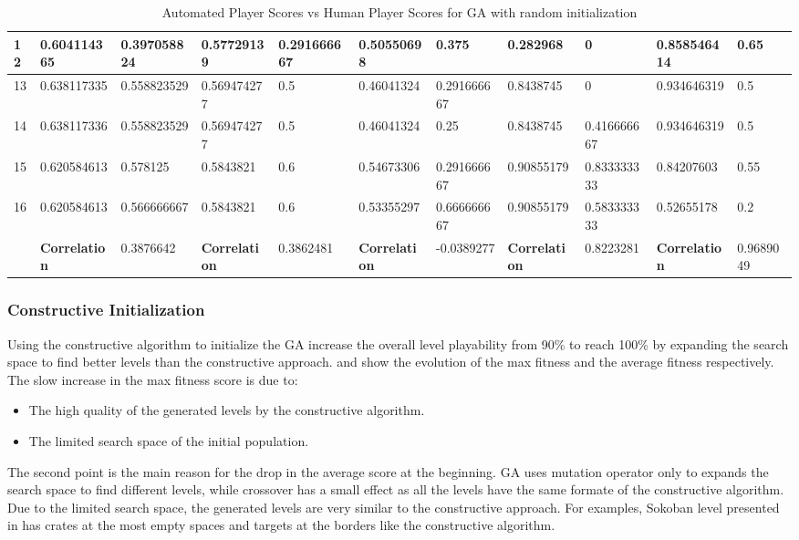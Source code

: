 \begin{landscape}
\begin{table}[!ht]
\begin{tabular}{|p{0.5in}|p{0.75in}|p{0.75in}|p{0.75in}|p{0.75in}|p{0.75in}|p{0.75in}|p{0.75in}|p{0.75in}|p{0.75in}|p{0.75in}|}
		\hline
		12 & 0.604114365 & 0.397058824 & 0.57729139 & 0.291666667 & 0.50550698 & 0.375 & 0.282968 & 0 & 0.858546414 & 0.65\\
		\hline
		13 & 0.638117335 & 0.558823529 & 0.569474277 & 0.5 & 0.46041324 & 0.291666667 & 0.8438745 & 0 & 0.934646319 & 0.5\\
		\hline
		14 & 0.638117336 & 0.558823529 & 0.569474277 & 0.5 & 0.46041324 & 0.25 & 0.8438745 & 0.416666667 & 0.934646319 & 0.5\\
		\hline
		15 & 0.620584613 & 0.578125 & 0.5843821 & 0.6 & 0.54673306 & 0.291666667 & 0.90855179 & 0.833333333 & 0.84207603 & 0.55\\
		\hline
		16 & 0.620584613 & 0.566666667 & 0.5843821 & 0.6 & 0.53355297 & 0.666666667 & 0.90855179 & 0.583333333 & 0.52655178 & 0.2\\
		\hline
		 & \textbf{Correlation} & 0.3876642 & \textbf{Correlation} & 0.3862481 & \textbf{Correlation} & -0.0389277 & \textbf{Correlation} & 0.8223281 & \textbf{Correlation} & 0.9689049\\
		\hline
	\end{tabular}
	\caption{Automated Player Scores vs Human Player Scores for GA with random initialization}
	\label{Table:randomScores}
\end{table}
\end{landscape}

\subsubsection{Constructive Initialization}
Using the constructive algorithm to initialize the GA increase the overall level playability from 90\% to reach 100\% by expanding the search space to find better levels than the constructive approach.  and  show the evolution of the max fitness and the average fitness respectively. The slow increase in the max fitness score is due to:
\begin{itemize} \itemsep0pt \parskip0pt 
	\item The high quality of the generated levels by the constructive algorithm.
	\item The limited search space of the initial population.
\end{itemize}
The second point is the main reason for the drop in the average score at the beginning. GA uses mutation operator only to expands the search space to find different levels, while crossover has a small effect as all the levels have the same formate of the constructive algorithm. Due to the limited search space, the generated levels are very similar to the constructive approach. For examples, Sokoban level presented in  has crates at the most empty spaces and targets at the borders like the constructive algorithm.

